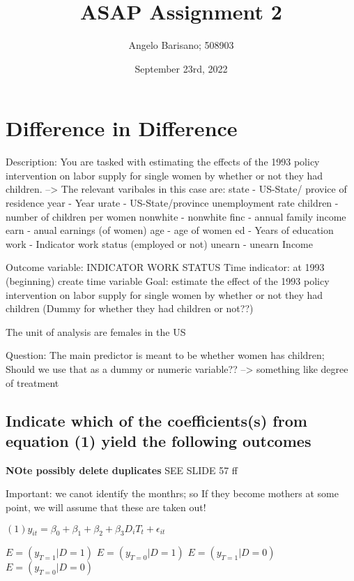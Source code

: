 \documentclass[a4paper]{article}
\begin{document}
\title{ASAP Assignment 2}
\author{Angelo Barisano; 508903 }
\date{September 23rd, 2022}
\maketitle

\newpage
\section{Difference in Difference}


Description:
You are tasked with estimating the effects of the 1993 policy intervention on labor supply for single women by whether or not they had children.
--> The relevant varibales in this case are: 
state - US-State/ provice of residence
year - Year
urate - US-State/province unemployment rate
children - number of children per women
nonwhite - nonwhite
finc - annual family income
earn - anual earnings (of women)
age - age of women
ed - Years of education
work - Indicator work status (employed or not)
unearn - unearn Income 

Outcome variable: INDICATOR WORK STATUS
Time indicator: at 1993 (beginning) create time variable
Goal: estimate the effect of the 1993 policy intervention on labor supply for single women by whether or not they had children (Dummy for whether they had children or not??)


The unit of analysis are females in the US

Question: The main predictor is meant to be whether women has children; Should we use that as a dummy or numeric variable?? --> something like degree of treatment



\subsection{Indicate which of the coefficients(s) from equation (1) yield the following outcomes}

\textbf{NOte possibly delete duplicates}
SEE SLIDE 57 ff

Important: we canot identify the monthrs; so If they become mothers at some point, we will assume that these are taken out!



$
(1) {y_{it}} = \beta_{0} + \beta_{1} + \beta_{2} + \beta_{3} D_i T_t + \epsilon_{it}
$


$E = (y_{T=1} | D=1)$
$E = (y_{T=0} | D=1)$
$E = (y_{T=1} | D=0)$
$E = (y_{T=0} | D=0)$
\end{document}
